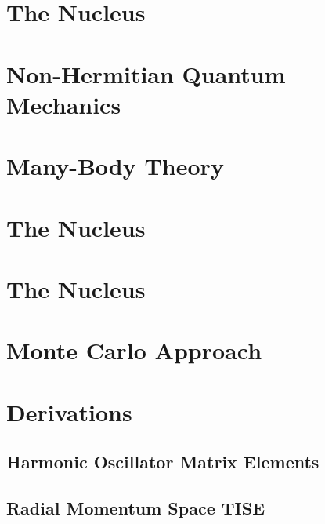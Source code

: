 \documentclass[12pt,a4paper]{report}
\begin{document}
\chapter{The  Nucleus}
\label{cha:he5}


\chapter{Non-Hermitian Quantum Mechanics} 
\label{cha:nhqm}


\chapter{Many-Body Theory}
\label{cha:many-body}



\chapter{The  Nucleus}
\label{cha:he6}


\chapter{The  Nucleus}
\label{cha:he7}

\chapter{Monte Carlo Approach}
\label{cha:monte carlo}

\appendix


\chapter{Derivations}

\section{Harmonic Oscillator Matrix Elements}
\label{sec:HO matrix elements}



\section{Radial Momentum Space TISE}
\label{sec:radial mom space TISE}




{}
\end{document}

